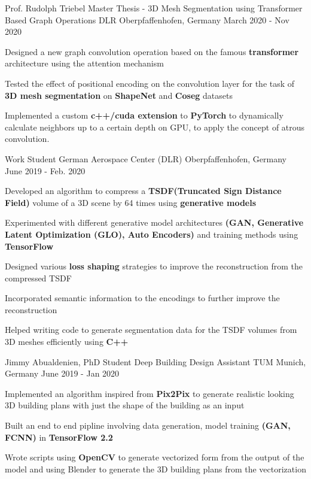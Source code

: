 \begin{cventries}
  \cventry
  {Prof. Rudolph Triebel} %
  {Master Thesis - 3D Mesh Segmentation using Transformer Based Graph Operations} %
  {DLR Oberpfaffenhofen, Germany} %
  {March 2020 - Nov 2020} %
  {
  \begin{cvitems} %
    \item {Designed a new graph convolution operation based on the famous
    \textbf{transformer} architecture using the attention mechanism}
    \item {Tested the effect of positional encoding on the convolution layer for
    the task of \textbf{3D mesh segmentation} on \textbf{ShapeNet} and \textbf{Coseg} datasets}
    \item {Implemented a custom \textbf{c++/cuda extension} to \textbf{PyTorch}
    to dynamically calculate neighbors up to a certain depth on GPU, to apply the
    concept of atrous convolution.}
  \end{cvitems}
  }
  \cventry
  {Work Student} %
  {German Aerospace Center (DLR)} %
  {Oberpfaffenhofen, Germany} %
  {June 2019 - Feb. 2020} %
  {
  \begin{cvitems} %
    \item {Developed an algorithm to compress a \textbf{TSDF(Truncated Sign
    Distance Field)} volume of a 3D scene by 64 times using
    \textbf{generative models}}
    \item {Experimented with different generative model architectures
    \textbf{(GAN, Generative Latent Optimization (GLO), Auto Encoders)} and
    training methods using \textbf{TensorFlow}}
    \item {Designed various \textbf{loss shaping} strategies to improve the
    reconstruction from the compressed TSDF}
    \item {Incorporated semantic information to the encodings to further improve the reconstruction}
    \item {Helped writing code to generate segmentation data for the TSDF
    volumes from 3D meshes efficiently using \textbf{C++}}
  \end{cvitems}
  }
	\cventry
	{Jimmy Abualdenien, PhD Student} %
	{Deep Building Design Assistant} %
	{TUM Munich, Germany} %
	{June 2019 - Jan 2020} %
	{
		\begin{cvitems} %
			\item {Implemented an algorithm inspired from \textbf{Pix2Pix} to generate realistic looking 3D building plans with just the shape of the building as an input}
			\item {Built an end to end pipline involving data generation, model training \textbf{(GAN, FCNN)} in \textbf{TensorFlow 2.2}}
			\item {Wrote scripts using \textbf{OpenCV} to generate vectorized form from the output of the model and using Blender to generate the 3D building plans from the vectorization}
		\end{cvitems}
	}
\end{cventries}
